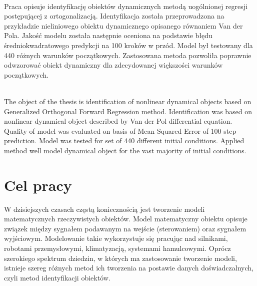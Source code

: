 



\renewcommand{\tablename}{Tabela}

\pagestyle{empty}
\stronatytulowa

\newpage
\setcounter{page}{1}

\newpage
\textbf{\tytulpl} \vspace*{0.2cm} \\
Praca opisuje identyfikację obiektów dynamicznych metodą uogólnionej regresji postępującej z ortogonalizacją. Identyfikacja została przeprowadzona na przykładzie nieliniowego obiektu dynamicznego opisanego równaniem Van der Pola. Jakość modelu została następnie oceniona na podstawie błędu średniokwadratowego predykcji na 100 kroków w przód. Model był testowany dla 440 różnych warunków początkowych. Zastosowana metoda pozwoliła poprawnie odwzorować obiekt dynamiczny dla zdecydowanej większości warunków początkowych.

\vspace*{2cm}
\textbf{\tytulen} \vspace*{0.2cm} \\
The object of the thesis is identification of nonlinear dynamical objects based on Generalized Orthogonal Forward Regression method. Identification was based on nonlinear dynamical object described by Van der Pol differential equation. Quality of model was evaluated on basis of Mean Squared Error of 100 step prediction. Model was tested for set of 440 different initial conditions. Applied method well model dynamical object for the vast majority of initial conditions.

\newpage
\tableofcontents

\newpage
\pagestyle{plain}

\section{Cel pracy}
	W dzisiejszych czasach częstą koniecznością jest tworzenie modeli matematycznych rzeczywistych obiektów. Model matematyczny obiektu opisuje związek między sygnałem podawanym na wejście (sterowaniem) oraz sygnałem wyjściowym. Modelowanie takie wykorzystuje się pracując nad silnikami, robotami przemysłowymi, klimatyzacją, systemami hamulcowymi\cite{Isermann}. Oprócz szerokiego spektrum dziedzin, w których ma zastosowanie tworzenie modeli, istnieje szereg różnych metod ich tworzenia na postawie danych doświadczalnych, czyli metod identyfikacji obiektów.
	
